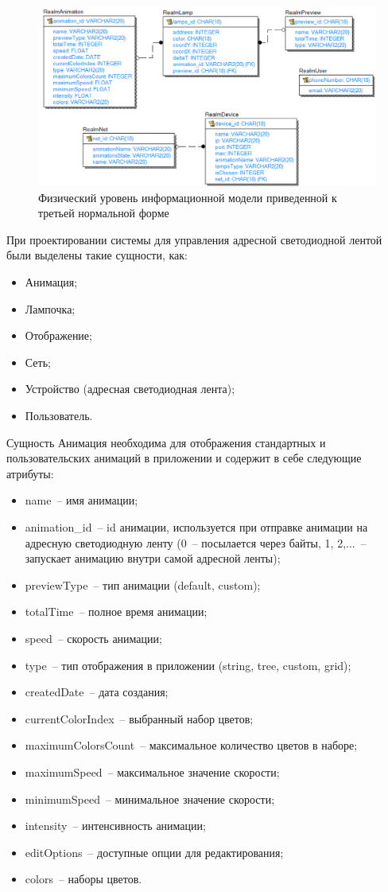 ~
\begin{figure}[H]
\centering
	\includegraphics[scale=0.55]{figures/diagrams/er_diagram_physical.png}
	\caption{Физический уровень информационной модели приведенной к третьей нормальной форме}
	\label{fig:develop:erDiagrams:erPhysic}
\end{figure}

При проектировании системы для управления адресной светодиодной лентой были выделены такие сущности, как:
\begin{itemize}
	\item Анимация;
	\item Лампочка;
	\item Отображение;
	\item Сеть;
	\item Устройство (адресная светодиодная лента);
	\item Пользователь.
\end{itemize}

Сущность Анимация необходима для отображения стандартных и пользовательских анимаций в приложении и содержит в себе следующие атрибуты:
\begin{itemize}
	\item name~-- имя анимации;
	\item animation\_id~-- id анимации, используется при отправке анимации на адресную светодиодную ленту (0~-- посылается через байты, 1, 2,...~-- запускает анимацию внутри самой адресной ленты);
	\item previewType~-- тип анимации (default, custom);
	\item totalTime~-- полное время анимации;
	\item speed~-- скорость анимации;
	\item type~-- тип отображения в приложении (string, tree, custom, grid);
	\item createdDate~-- дата создания;
	\item currentColorIndex~-- выбранный набор цветов;
	\item maximumColorsCount~-- максимальное количество цветов в наборе;
	\item maximumSpeed~-- максимальное значение скорости;
	\item minimumSpeed~-- минимальное значение скорости;
	\item intensity~-- интенсивность анимации;
	\item editOptions~-- доступные опции для редактирования;
	\item colors~-- наборы цветов.
\end{itemize}

